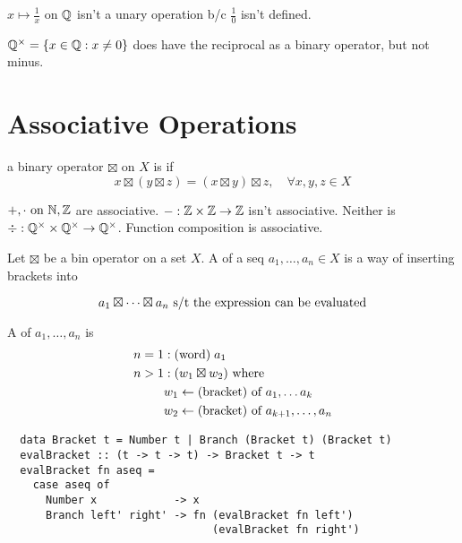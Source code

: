\documentclass[12pt]{report}
\begin{document}
\bboxnote
\(x\mapsto\frac1x\) on \(\mathbb Q\) isn't a unary operation b/c \(\frac10\) isn't
defined.

\(\mathbb Q^\times=\{x\in\mathbb Q:x\neq 0\}\) does have the reciprocal as a binary operator,
but not minus.
\ebox

\section{Associative Operations}
\newcommand{\gop}[0]{\boxtimes}

\bbox
\begin{defn}
  a binary operator \(\gop\) on \(X\) is  if 
  \[x\gop(y\gop z)=(x\gop y)\gop z,\quad\forall x,y,z\in X\]
\end{defn}
\ebox

\bboxnote
\(+,\cdot\text{ on }\mathbb N,\mathbb Z\) are associative. \(-:\mathbb Z\times\mathbb Z\to\mathbb Z\) isn't
associative. Neither is \(\div:\mathbb Q^\times\times\mathbb Q^\times\to\mathbb Q^\times\). Function
composition is associative.
\ebox

\bbox
\begin{defn}
  Let \(\gop\) be a bin operator on a set \(X\). A  of a seq
  \(a_1,\dots,a_n\in X\) is a way of inserting brackets into
\end{defn}
\[a_1\gop\cdots\gop a_n\st\T{the expression can be evaluated}\]
\ebox


\bbox
\begin{defn}[Bracketing]
  A  of \(a_1,\dots,a_n\) is
  \begin{equation*}
    \begin{split}
      n=1 &:\TM{word}\;a_1\\
      n>1 &:(w_1\gop w_2)\T{ where}\\
          &w_1\is\TM{bracket}\T{ of }a_1,\dots a_k\\
          &w_2\is\TM{bracket}\T{ of }a_{k+1},\dots,a_n
    \end{split}
  \end{equation*}
\end{defn}
\ebox

\begin{tcolorbox}[colback=red!20!white,colframe=red]
  \begin{verbatim}
  data Bracket t = Number t | Branch (Bracket t) (Bracket t) 
  evalBracket :: (t -> t -> t) -> Bracket t -> t
  evalBracket fn aseq =
    case aseq of
      Number x            -> x
      Branch left' right' -> fn (evalBracket fn left')
                                (evalBracket fn right')\end{verbatim}
\end{tcolorbox}
\end{document}
